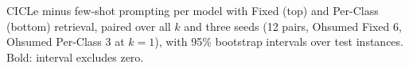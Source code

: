 \begin{table}[t]
  \centering
  \scriptsize
  \setlength{\tabcolsep}{3pt}
  \resizebox{\textwidth}{!}{}\par\medskip
  \resizebox{\textwidth}{!}{}
  \caption{CICLe minus few-shot prompting per model with Fixed (top) and Per-Class (bottom) retrieval, paired over all $k$ and three seeds (12 pairs, Ohsumed Fixed 6, Ohsumed Per-Class 3 at $k = 1$), with 95\% bootstrap intervals over test instances. Bold: interval excludes zero.}
  \label{tab:per_model}
\end{table}
